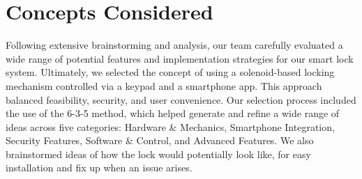\newpage
\section{Concepts Considered}


Following extensive brainstorming and analysis, our team carefully evaluated a wide range of potential features and implementation strategies for our smart lock system. Ultimately, we selected the concept of using a solenoid-based locking mechanism controlled via a keypad and a smartphone app. This approach balanced feasibility, security, and user convenience. Our selection process included the use of the 6-3-5 method, which helped generate and refine a wide range of ideas across five categories: Hardware \& Mechanics, Smartphone Integration, Security Features, Software \& Control, and Advanced Features. We also brainstormed ideas of how the lock would potentially look like, for easy installation and fix up when an issue arises. 


